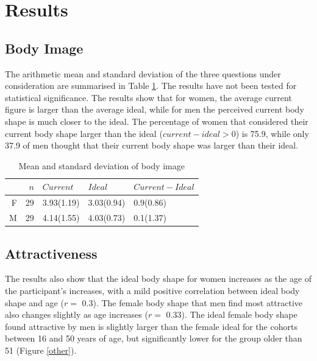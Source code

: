 \documentclass[a4paper, jou]{apa6}
\begin{document}
\section{Results}
\label{sec:orgffc2cb5}
\subsection{Body Image}
\label{sec:orgd18af2d}
The arithmetic mean and standard deviation of the three questions under consideration are summarised in Table \ref{results}. The results have not been tested for statistical significance. The results show that for women, the average current figure is larger than the average ideal, while for men the perceived current body shape is much closer to the ideal. The percentage of women that considered their current body shape larger than the ideal (\(current-ideal>0\)) is 75.9, while only 37.9 of men thought that their current body shape was larger than their ideal.


\begin{table}[ht]
\centering
\begin{tabular}{rrlll}
  \hline
 & $n$ & $Current$ & $Ideal$ & $Current-Ideal$ \\ 
  \hline
F &  29 & 3.93(1.19) & 3.03(0.94) & 0.9(0.86) \\ 
  M &  29 & 4.14(1.55) & 4.03(0.73) & 0.1(1.37) \\ 
   \hline
\end{tabular}
\caption{Mean and standard deviation of body image} 
\label{results}
\end{table}

\subsection{Attractiveness}
\label{sec:org15450df}
The results also show that the ideal body shape for women increases as the age of the participant's increases, with a mild positive correlation between ideal body shape and age (\(r=\) 0.3). The female body shape that men find most attractive also changes slightly as age increases (\(r=\) 0.33). The ideal female body shape found attractive by men is slightly larger than the female ideal for the cohorts between 16 and 50 years of age, but significantly lower for the group older than 51 (Figure \ref{other}).
\end{document}
